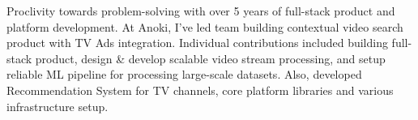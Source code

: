 
Proclivity towards problem-solving with over 5 years of full-stack product and platform development. At Anoki, I've led team building contextual video search product with TV Ads integration.
Individual contributions included building full-stack product, design \& develop scalable video stream processing, and setup reliable ML pipeline for processing large-scale datasets. 
Also, developed Recommendation System for TV channels, core platform libraries and various infrastructure setup.

